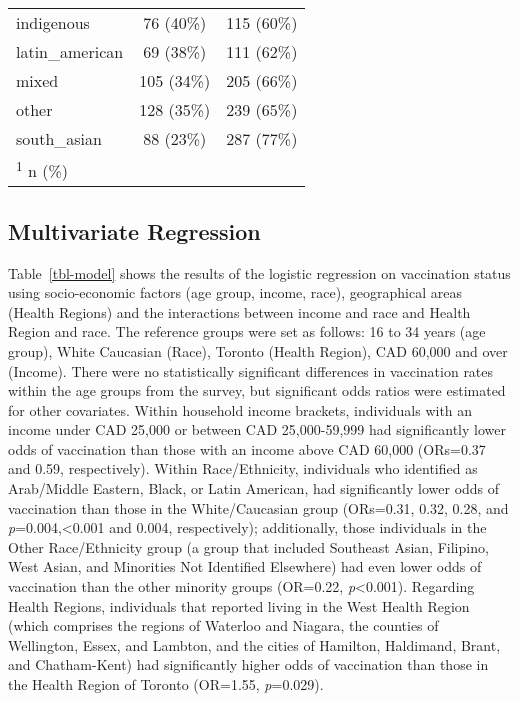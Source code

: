 \documentclass[
  letterpaper,
  DIV=11,
  numbers=noendperiod]{scrartcl}
\begin{document}
\begin{table}
\begin{tabular}{lcc}
\hspace{1em}indigenous & 76 (40\%) & 115 (60\%)\\
\hspace{1em}latin\_american & 69 (38\%) & 111 (62\%)\\
\hspace{1em}mixed & 105 (34\%) & 205 (66\%)\\
\hspace{1em}other & 128 (35\%) & 239 (65\%)\\
\hspace{1em}south\_asian & 88 (23\%) & 287 (77\%)\\
\bottomrule
\multicolumn{3}{l}{\rule{0pt}{1em}\textsuperscript{1} n (\%)}\\
\end{tabular}
\endgroup{}
\end{table}

\hypertarget{multivariate-regression}{%
\subsection{Multivariate Regression}\label{multivariate-regression}}

Table~\ref{tbl-model} shows the results of the logistic regression on
vaccination status using socio-economic factors (age group, income,
race), geographical areas (Health Regions) and the interactions between
income and race and Health Region and race. The reference groups were
set as follows: 16 to 34 years (age group), White Caucasian (Race),
Toronto (Health Region), CAD 60,000 and over (Income). There were no
statistically significant differences in vaccination rates within the
age groups from the survey, but significant odds ratios were estimated
for other covariates. Within household income brackets, individuals with
an income under CAD 25,000 or between CAD 25,000-59,999 had
significantly lower odds of vaccination than those with an income above
CAD 60,000 (ORs=0.37 and 0.59, respectively). Within Race/Ethnicity,
individuals who identified as Arab/Middle Eastern, Black, or Latin
American, had significantly lower odds of vaccination than those in the
White/Caucasian group (ORs=0.31, 0.32, 0.28, and
\emph{p}=0.004,\textless0.001 and 0.004, respectively); additionally,
those individuals in the Other Race/Ethnicity group (a group that
included Southeast Asian, Filipino, West Asian, and Minorities Not
Identified Elsewhere) had even lower odds of vaccination than the other
minority groups (OR=0.22, \emph{p}\textless0.001). Regarding Health
Regions, individuals that reported living in the West Health Region
(which comprises the regions of Waterloo and Niagara, the counties of
Wellington, Essex, and Lambton, and the cities of Hamilton, Haldimand,
Brant, and Chatham-Kent) had significantly higher odds of vaccination
than those in the Health Region of Toronto (OR=1.55, \emph{p}=0.029).
\end{document}
